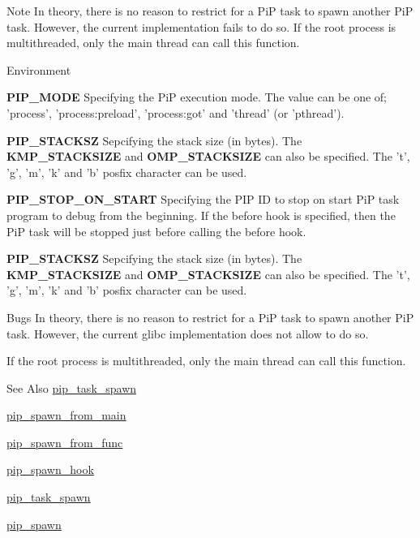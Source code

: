 \begin{DoxyNote}{Note}
In theory, there is no reason to restrict for a Pi\-P task to spawn another Pi\-P task. However, the current implementation fails to do so. If the root process is multithreaded, only the main thread can call this function.
\end{DoxyNote}
\begin{DoxyParagraph}{Environment}
\begin{DoxyItemize}
\item {\bfseries P\-I\-P\-\_\-\-M\-O\-D\-E} Specifying the Pi\-P execution mode. The value can be one of; 'process', 'process\-:preload', 'process\-:got' and 'thread' (or 'pthread'). \item {\bfseries P\-I\-P\-\_\-\-S\-T\-A\-C\-K\-S\-Z} Sepcifying the stack size (in bytes). The {\bfseries K\-M\-P\-\_\-\-S\-T\-A\-C\-K\-S\-I\-Z\-E} and {\bfseries O\-M\-P\-\_\-\-S\-T\-A\-C\-K\-S\-I\-Z\-E} can also be specified. The 't', 'g', 'm', 'k' and 'b' posfix character can be used. \item {\bfseries P\-I\-P\-\_\-\-S\-T\-O\-P\-\_\-\-O\-N\-\_\-\-S\-T\-A\-R\-T} Specifying the P\-I\-P I\-D to stop on start Pi\-P task program to debug from the beginning. If the before hook is specified, then the Pi\-P task will be stopped just before calling the before hook. \item {\bfseries P\-I\-P\-\_\-\-S\-T\-A\-C\-K\-S\-Z} Sepcifying the stack size (in bytes). The {\bfseries K\-M\-P\-\_\-\-S\-T\-A\-C\-K\-S\-I\-Z\-E} and {\bfseries O\-M\-P\-\_\-\-S\-T\-A\-C\-K\-S\-I\-Z\-E} can also be specified. The 't', 'g', 'm', 'k' and 'b' posfix character can be used.\end{DoxyItemize}

\end{DoxyParagraph}
\begin{DoxyParagraph}{Bugs}
In theory, there is no reason to restrict for a Pi\-P task to spawn another Pi\-P task. However, the current glibc implementation does not allow to do so. 
\end{DoxyParagraph}
\begin{DoxyParagraph}{}
If the root process is multithreaded, only the main thread can call this function.
\end{DoxyParagraph}
\begin{DoxySeeAlso}{See Also}
\hyperlink{group__PiP-1-spawn_gaf1fcc4cb85ec3eda734afe2beb0c6a36}{pip\-\_\-task\-\_\-spawn} 

\hyperlink{group__PiP-1-spawn_gad7708867e5370ae0a4ae71b16f446f16}{pip\-\_\-spawn\-\_\-from\-\_\-main} 

\hyperlink{group__PiP-1-spawn_ga71d2d053e9c7153adc167e2cf1adf12e}{pip\-\_\-spawn\-\_\-from\-\_\-func} 

\hyperlink{group__PiP-1-spawn_ga1c3f1d9e029f68dbcfb7d78b7dfa1533}{pip\-\_\-spawn\-\_\-hook} 

\hyperlink{group__PiP-1-spawn_gaf1fcc4cb85ec3eda734afe2beb0c6a36}{pip\-\_\-task\-\_\-spawn} 

\hyperlink{group__PiP-1-spawn_ga4698d85283b03f0443fb0991e1119d35}{pip\-\_\-spawn} 
\end{DoxySeeAlso}
